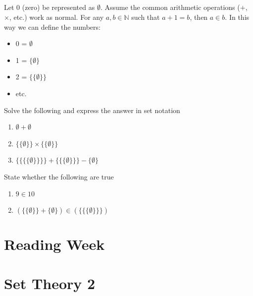 \documentclass[twocolumn]{article}
\begin{document}
\subsection{}

Let 0 (zero) be represented as $\emptyset$. Assume the common arithmetic operations ($+$, $\times$, etc.) work as normal. For any $a, b \in \mathbb{N}$ such that $a + 1 = b$, then $a \in b $. In this way we can define the numbers:

    \begin{itemize}
        \item 0 = $ \emptyset $
        \item 1 = $ \{ \emptyset \} $
        \item 2 = $ \{ \{ \emptyset \} \} $
        \item etc.
    \end{itemize}

     Solve the following and express the answer in set notation
    
    \begin{enumerate}
        \item $ \emptyset + \emptyset $
        \item $ \{ \{ \emptyset \} \} \times \{ \{ \emptyset \} \} $
        \item $\{ \{ \{ \{ \emptyset \} \} \} \} + \{ \{ \{ \emptyset \} \} \} - \{ \emptyset \} $
    \end{enumerate}
    
    State whether the following are true

    \begin{enumerate}
        \item $ 9 \in 10 $
        \item $ (\{ \{ \emptyset \} \} + \{ \emptyset \} ) \in ( \{ \{ \{ \emptyset \} \} \} )$
    \end{enumerate}

\clearpage
\section{Reading Week}
    

\clearpage
\section{Set Theory 2}

\subsection{}
\end{document}
